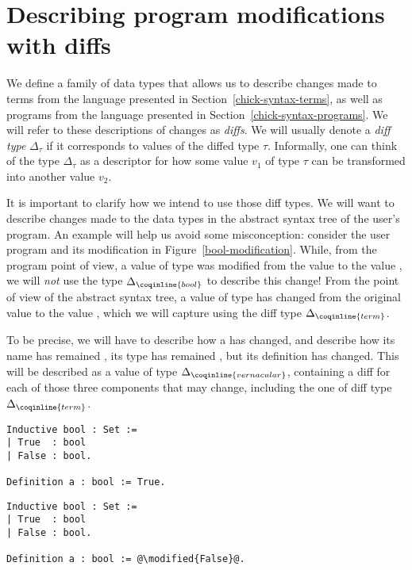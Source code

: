 \section{Describing program modifications with diffs}\label{chick-diffs}

We define a family of data types that allows us to describe changes made to
terms from the language presented in Section~\ref{chick-syntax-terms}, as well
as programs from the language presented in Section~\ref{chick-syntax-programs}.
We will refer to these descriptions of changes as \textit{diffs}.  We will
usually denote a \textit{diff type} $\Delta_{\tau}$ if it corresponds to values
of the diffed type $\tau$.  Informally, one can think of the type
$\Delta_{\tau}$ as a descriptor for how some value $v_{1}$ of type $\tau$ can be
transformed into another value $v_{2}$.

It is important to clarify how we intend to use those diff types.  We will want
to describe changes made to the data types in the abstract syntax tree of the
user's program.  An example will help us avoid some misconception: consider the
user program and its modification in Figure~\ref{bool-modification}.  While,
from the program point of view, a value of type  was modified
from the value  to the value , we will
\emph{not} use the type $\Delta_{\coqinline{bool}}$ to describe this change!
From the point of view of the abstract syntax tree, a value of type
 has changed from the original value  to
the value , which we will capture using the diff type
$\Delta_{\coqinline{term}}$.

To be precise, we will have to describe how a  has
changed, and describe how its name has remained , its type has
remained , but its definition has changed.  This will be
described as a value of type $\Delta_{\coqinline{vernacular}}$, containing a
diff for each of those three components that may change, including the one of
diff type $\Delta_{\coqinline{term}}$.

\begin{figure*}[!htp]

  \noindent%
  \begin{minipage}[t]{0.50\textwidth}
    \begin{verbatim}
Inductive bool : Set :=
| True  : bool
| False : bool.

Definition a : bool := True.
\end{verbatim}
\end{minipage}%
\begin{minipage}[t]{0.50\textwidth}
  \begin{verbatim}
Inductive bool : Set :=
| True  : bool
| False : bool.

Definition a : bool := @\modified{False}@.
\end{verbatim}
\end{minipage}

\caption{A simple program and its modification}

\label{bool-modification}

\end{figure*}

